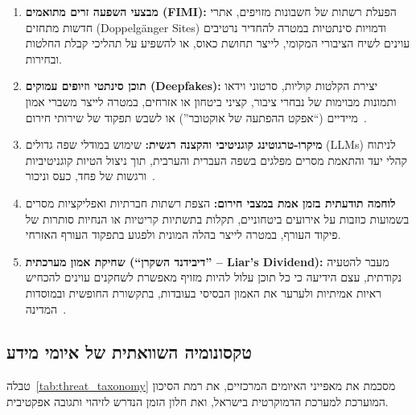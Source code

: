\begin{enumerate}
    \item \textbf{מבצעי השפעה זרים מתואמים (\textenglish{FIMI}):} הפעלת רשתות של חשבונות מזויפים, אתרי חדשות מתחזים (\textenglish{Doppelgänger Sites}) ודמויות סינתטיות במטרה להחדיר נרטיבים עוינים לשיח הציבורי המקומי, לייצר תחושת כאוס, או להשפיע על תהליכי קבלת החלטות ובחירות.
    \item \textbf{תוכן סינתטי וזיופים עמוקים (\textenglish{Deepfakes}):} יצירת הקלטות קוליות, סרטוני וידאו ותמונות מבוימות של נבחרי ציבור, קציני ביטחון או אזרחים, במטרה לייצר משברי אמון מיידיים (``אפקט ההפתעה של אוקטובר'') או לשבש תפקוד של שירותי חירום~\cite{chesney2019deep}.
    \item \textbf{מיקרו-טרגוטינג קוגניטיבי והקצנה רגשית:} שימוש במודלי שפה גדולים (\textenglish{LLMs}) לניתוח קהלי יעד והתאמת מסרים מפלגים בשפה העברית והערבית, תוך ניצול הטיות קוגניטיביות ורגשות של פחד, כעס וניכור~\cite{tucker2018social}.
    \item \textbf{לוחמה תודעתית בזמן אמת במצבי חירום:} הצפת רשתות חברתיות ואפליקציות מסרים בשמועות כוזבות על אירועים ביטחוניים, תקלות בתשתיות קריטיות או הנחיות סותרות של פיקוד העורף, במטרה לייצר בהלה המונית ולפגוע בתפקוד העורף האזרחי.
    \item \textbf{שחיקת אמון מערכתית (``דיבידנד השקרן'' -- \textenglish{Liar's Dividend}):} מעבר להטעיה נקודתית, עצם הידיעה כי כל תוכן עלול להיות מזויף מאפשרת לשחקנים עוינים להכחיש ראיות אמיתיות ולערער את האמון הבסיסי בעובדות, בתקשורת החופשית ובמוסדות המדינה~\cite{chesney2019deep}.
\end{enumerate}

\subsection{טקסונומיה השוואתית של איומי מידע}

טבלה~\ref{tab:threat_taxonomy} מסכמת את מאפייני האיומים המרכזיים, את רמת הסיכון המוערכת למערכת הדמוקרטית בישראל, ואת חלון הזמן הנדרש לזיהוי ותגובה אפקטיבית.

